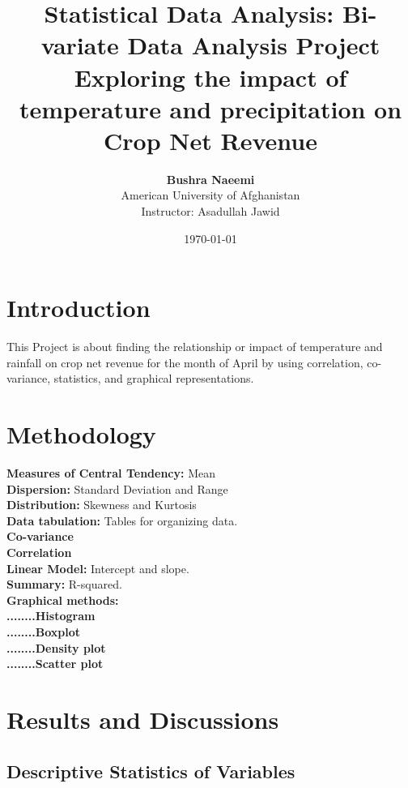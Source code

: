 \documentclass[12pt, a4paper]{article}
\begin{document}
\title{Statistical Data Analysis: Bi-variate Data Analysis Project\\
\large Exploring the impact of temperature and precipitation on Crop Net Revenue}
\author{\textbf{Bushra Naeemi}
\\American University of Afghanistan
\\Instructor: Asadullah Jawid } 
\date{\today}
\maketitle 

\newpage
\tableofcontents

\newpage
\section{Introduction}
\justify
This Project is about finding the relationship or impact of temperature and rainfall on crop net revenue for the month of April by using correlation, co-variance, statistics, and graphical representations.
\section{Methodology}


\textbf{Measures of Central Tendency:} Mean\\
\textbf{Dispersion:} Standard Deviation and Range\\
\textbf{Distribution:} Skewness and Kurtosis\\
\textbf{Data tabulation:} Tables for organizing data.\\ 
\textbf{Co-variance} \\
\textbf{Correlation} \\
\textbf{Linear Model:} Intercept and slope.\\
\textbf{Summary: } R-squared.\\
\textbf{Graphical methods:}\\
\textbf{ }
\textbf {........Histogram}\\
\textbf {........Boxplot}\\
\textbf {........Density plot}\\ 
\textbf {........Scatter plot}\\

\newpage
\section{Results and Discussions}
\subsection{Descriptive Statistics of Variables}
\end{document}
